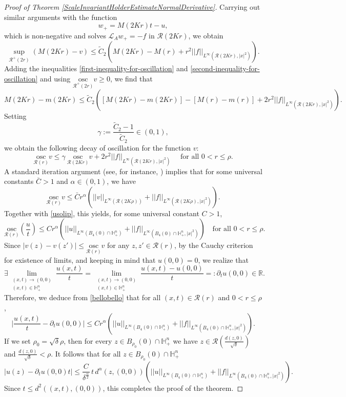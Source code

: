 \documentclass[12pt]{amsart}
\newcommand{\osc}{\mathrm{osc}}
\newcommand{\R}{{\mathbb R}}
\def \H {{\mathbb H}}
\def \L {\mathcal{L}}
\def \r {\mathcal R}
\begin{document}
\begin{proof}[Proof of Theorem \ref{ScaleInvariantHolderEstimateNormalDerivative}]
Carrying out similar arguments with the function 
\[w_+ = M(2Kr) t - u,\]
which is non-negative and solves $\L_Aw_+ = -f$ in $\r(2Kr)$, we obtain
\begin{equation}\label{second-inequality-for-oscillation}
\sup_{\r^+(2r)} (M(2Kr)-v) \leq \tilde{C}_2 \left(M(2Kr) - M(r) + r^2  ||f||_{L^{\infty}(\r(2Kr),|x|^{2})}  \right).
\end{equation}
Adding the inequalities \eqref{first-inequality-for-oscillation} and \eqref{second-inequality-for-oscillation} and using $\underset{\r^+(2r)}{\osc} v \geq 0$, we find that
\[
M(2Kr)-m(2Kr) \leq \tilde{C}_2 \left(\left[M(2Kr) - m(2Kr) \right] - \left[M(r) - m(r) \right] + 2r^2  ||f||_{L^{\infty}(\r(2Kr),|x|^{2})} \right).
\]
Setting $$\gamma := \frac{\tilde{C}_2-1}{\tilde{C}_2} \in (0,1),$$ we obtain the following decay of oscillation for the function $v$:
$$\underset{\r(r)}{\osc} v \leq \gamma \ \underset{\r(2Kr)}{\osc} v +  2 r^2  ||f||_{L^{\infty}(\r(2Kr),|x|^{2})}\quad\mbox{ for all }0<r\leq \rho.
$$
A standard iteration argument (see, for instance, \cite[Lemma 8.23]{GTBook}) implies that for some universal constants $\bar{C} > 1$ and $\alpha \in (0,1)$, we have
$$\underset{\r(r)}{\osc} v \leq \bar{C} r^{\alpha} \left( ||v||_{L^{\infty}(\r(2K\rho))}  +  ||f||_{L^{\infty}(\r(2K\rho),|x|^{2})}\right).
$$
Together with \eqref{usolip}, this yields, for some universal constant $C>1$,
\begin{equation}\label{bellobello}
\underset{\r(r)}{\osc} \left(\frac{u}{t}\right) \leq C r^{\alpha} \left( ||u||_{L^{\infty}(B_{4}(0)\cap \H^n_+)}  +  ||f||_{L^{\infty}(B_{4}(0)\cap \H^n_+,|x|^{2})}\right) \quad\mbox{for all }0<r\leq \rho.
\end{equation}
Since $|v(z)-v(z')|\leq \underset{\r(r)}{\osc}v$ for any $z,z'\in \r(r)$, by the Cauchy criterion for existence of limits, and keeping in mind that $u(0,0)=0$, we realize that
$$
\exists \lim_{\substack{(x,t)\to (0,0) \\ (x,t)\in \H^n_+}} \frac{u(x,t)}{t}= \lim_{\substack{(x,t)\to (0,0) \\ (x,t)\in \H^n_+}} \frac{u(x,t)-u(0,0)}{t}=:\partial_t u(0,0)\in\R.
$$
Therefore, we deduce from \eqref{bellobello} that for all $(x,t)\in \r(r)$ and $0 < r \leq \rho$,
\[
\bigg|\frac{u(x,t)}{t} -  \partial_t u(0,0) \bigg| \leq C r^{\alpha}  \left( ||u||_{L^{\infty}(B_{4}(0)\cap \H^n_+)}  +  ||f||_{L^{\infty}(B_{4}(0)\cap \H^n_+,|x|^{2})}\right). 
\]
If we set $\rho_0=\sqrt{\delta} \rho$, then for every $z\in B_{\rho_0}(0)\cap \H^n_+$ we have $z\in \r\left(\frac{d(z,0)}{\sqrt{\delta}}\right)$ and $\frac{d(z,0)}{\sqrt{\delta}}<\rho$. It follows that for all $z\in B_{\rho_0}(0)\cap \H^n_+$
$$
\left|u(z) -  \partial_t u(0,0) t \right| \leq \frac{C}{\delta^{\frac{\alpha}{2}}}\, t\, d^{\alpha}(z,(0,0))  \left( ||u||_{L^{\infty}(B_{4}(0)\cap \H^n_+)}  +  ||f||_{L^{\infty}(B_{4}(0)\cap \H^n_+,|x|^{2})}\right).
$$
Since $t\leq d^2((x,t),(0,0))$, this completes the proof of the theorem.
\end{proof}
\end{document}
